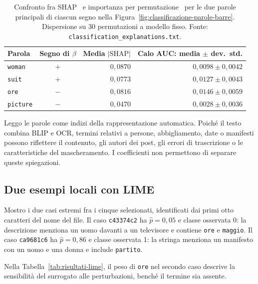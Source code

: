 \begin{table}[htbp]
    \centering\small
    \caption{Confronto fra SHAP~\cite{NIPS2017_8a20a862} e importanza per permutazione~\cite{JMLR:v20:18-760} per le due parole principali di ciascun segno nella Figura~\ref{fig:classificazione-parole-barre}. Dispersione su 30 permutazioni a modello fisso. Fonte: \texttt{classification\_explanations.txt}.}
    \label{tab:associazione-parole-importanza}
    \begin{tabular}{@{}lcrr@{}}
        \toprule
        Parola & Segno di $\beta$ & Media $|\mathrm{SHAP}|$ & Calo AUC: media $\pm$ dev.\ std. \\
        \midrule
        \texttt{woman} & $+$ & $0{,}0870$ & $0{,}0098\pm0{,}0042$ \\
        \texttt{suit} & $+$ & $0{,}0773$ & $0{,}0127\pm0{,}0043$ \\
        \texttt{ore} & $-$ & $0{,}0816$ & $0{,}0146\pm0{,}0059$ \\
        \texttt{picture} & $-$ & $0{,}0470$ & $0{,}0028\pm0{,}0036$ \\
        \bottomrule
    \end{tabular}
\end{table}

\newpage
Leggo le parole come indizi della rappresentazione automatica. Poiché il testo combina BLIP e OCR, termini relativi a persone, abbigliamento, date o manifesti possono riflettere il contenuto, gli autori dei post, gli errori di trascrizione o le caratteristiche del mascheramento. I coefficienti non permettono di separare queste spiegazioni.

\subsection{Due esempi locali con LIME}
\label{subsec:risultati-spiegazioni-locali}

Mostro i due casi estremi fra i cinque selezionati, identificati dai primi otto caratteri del nome del file. Il caso \texttt{c43374c2} ha $\widehat p=0{,}05$ e classe osservata 0: la descrizione menziona un uomo davanti a un televisore e contiene \texttt{ore} e \texttt{maggio}. Il caso \texttt{ca9681c6} ha $\widehat p=0{,}86$ e classe osservata 1: la stringa menziona un manifesto con un uomo e una donna e include \texttt{partito}.

Nella Tabella~\ref{tab:risultati-lime}, il peso di \texttt{ore} nel secondo caso descrive la sensibilità del surrogato alle perturbazioni, benché il termine sia assente.

